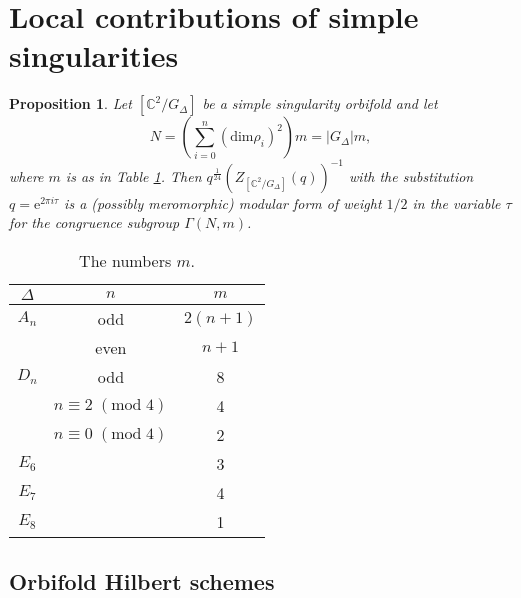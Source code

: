 \documentclass[11pt,a4paper]{amsart}
\newtheorem{proposition}[theorem]{Proposition}
\theoremstyle{definition}
\newcommand{\SC}{\mathbb{C}}                    %
\begin{document}
\section{Local contributions of simple singularities}
\label{sec:loccontr}


\begin{proposition}
\label{prop:locmod}
 Let $[\SC^2/G_\Delta]$ be a simple singularity orbifold and let 
 \[N=\left(\sum_{i=0}^n (\mathrm{dim} \rho_i)^2\right)m=|G_\Delta|m,\]
 where  $m$ is as in Table \ref{table:congorder}. 
 Then $q^{\frac{1}{24}}(Z_{[\SC^2/G_\Delta]}(q))^{-1}$ with the substitution $q=\mathrm{e}^{2 \pi i \tau}$ is a (possibly meromorphic) modular form of weight $1/2$ in the variable $\tau$ for the congruence subgroup $\Gamma(N,m)$.
\end{proposition}


\begin{table}
	\begin{tabular}{ |c|c|c| }
		\hline
		$\Delta$ & $n$ & $m$ \\
		\hline
		$A_n$ & odd & $2(n+1)$ \\
		& even & $n+1$ \\
		$D_n$ & odd & 8 \\
		& $n \equiv 2\;(\mathrm{mod}\;4)$ & 4 \\
		& $n \equiv 0\;(\mathrm{mod}\;4)$ & 2 \\
		$E_6$ & & 3 \\
		$E_7$ & & 4 \\
		$E_8$ & & 1 \\
		\hline
	\end{tabular}
	\vspace{0.2in}
	\caption{The numbers $m$.}
	\label{table:congorder}
\end{table}

\subsection{Orbifold Hilbert schemes}
\end{document}
